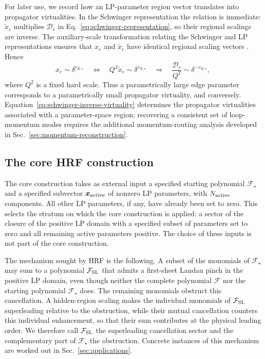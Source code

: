 \documentclass[a4paper,11pt]{article}
\newcommand{\x}{\boldsymbol{x}}
\newcommand{\FSL}{\mathcal F_{\rm SL}}
\begin{document}
For later use, we record how an LP-parameter region vector translates into
propagator virtualities.  In the Schwinger representation the relation is
immediate: \(\widetilde x_e\) multiplies \(\mathcal D_e\) in
Eq.~\eqref{eq:schwinger-representation}, so their regional scalings are
inverse.  The auxiliary-scale transformation relating the Schwinger and LP
representations ensures that \(x_e\) and \(\widetilde x_e\) have identical
regional scaling vectors \cite[App.~B]{Gardi:2022khw}.  Hence
\begin{equation}
 x_e\sim\delta^{v_{R,e}}
 \quad\Longleftrightarrow\quad
 Q^2\widetilde x_e\sim\delta^{v_{R,e}}
 \quad\Longrightarrow\quad
 \frac{\mathcal D_e}{Q^2}\sim\delta^{-v_{R,e}},
 \label{eq:schwinger-inverse-virtuality}
\end{equation}
where \(Q^2\) is a fixed hard scale.  Thus a parametrically large edge parameter
corresponds to a parametrically small propagator virtuality, and conversely.
Equation~\eqref{eq:schwinger-inverse-virtuality} determines the propagator
virtualities associated with a parameter-space region; recovering a
consistent set of loop-momentum modes requires the additional momentum-routing
analysis developed in Sec.~\ref{sec:momentum-reconstruction}.

\subsection{The core HRF construction}
\label{sec:ordinary}

The core construction takes as external input a specified starting polynomial
\(\mathcal F_\star\) and a specified subvector \(\x_{\rm active}\) of nonzero
LP parameters, with \(N_{\rm active}\) components.  All other LP parameters,
if any, have already been set to zero.  This selects the stratum on which the
core construction is applied: a sector of the closure of the positive LP
domain with a specified subset of parameters set to zero and all remaining
active parameters positive.  The choice of these inputs is not part of the
core construction.

The mechanism sought by HRF is the following.  A subset of the monomials of
\(\mathcal F_\star\) may sum to a polynomial \(\FSL\) that admits a
first-sheet Landau pinch in the positive LP domain, even though neither the
complete polynomial \(\mathcal F\) nor the starting polynomial
\(\mathcal F_\star\) does.  The remaining monomials obstruct this
cancellation.  A hidden-region scaling makes the individual monomials of
\(\FSL\) superleading relative to the obstruction, while their mutual
cancellation counters this individual enhancement, so that their sum
contributes at the physical leading order.  We therefore call \(\FSL\) the
superleading cancellation sector and the complementary part of
\(\mathcal F_\star\) the obstruction.  Concrete instances of this mechanism
are worked out in Sec.~\ref{sec:applications}.
\end{document}

